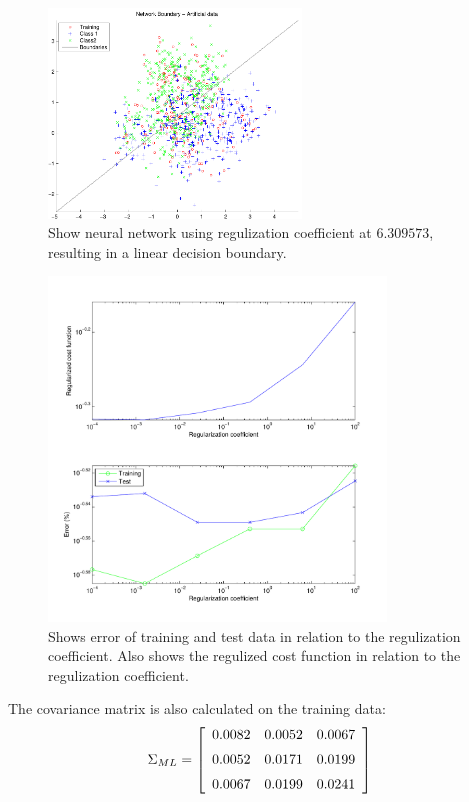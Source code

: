 \begin{figure}[!htbp]
  \centering
  \includegraphics[width=0.6\textwidth]{./images/q210b_reg5}
  \caption{Show neural network using regulization coefficient at $6.309573$, resulting in
    a linear decision boundary.}
  \label{fig:q210breg5}
\end{figure}

\begin{figure}[!htbp]
  \centering
  \includegraphics[width=0.8\textwidth]{./images/q210b_error}
  \caption{Shows error of training and test data in relation to the
    regulization coefficient. Also shows the regulized cost function
    in relation to the regulization coefficient.}
  \label{fig:q210berror}
\end{figure}

\newpage

The covariance matrix is also calculated on the training data:\\
$$\Sigma _{ML} = \left[
  \begin {array}{ccc}
    0.0082 & 0.0052 & 0.0067\\
    \noalign{\medskip}
    0.0052 & 0.0171 & 0.0199\\
    \noalign{\medskip}
    0.0067 & 0.0199 & 0.0241\\
  \end {array}
  \right]$$
